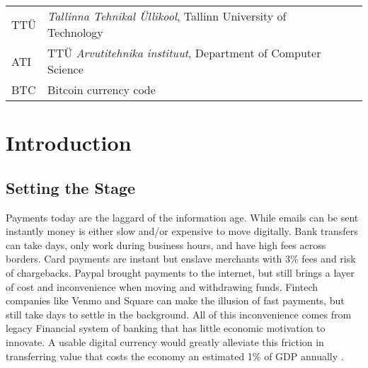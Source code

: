 \documentclass[12pt]{article} %
\begin{document}
\begin{tabular}{p{3 cm}ll} %
TTÜ & \textit{Tallinna Tehnikal Üllikool}, Tallinn University of Technology\\
ATI & TTÜ \textit{Arvutitehnika instituut}, Department of Computer Science\\
BTC & Bitcoin currency code
\end{tabular}


\pagebreak

\tableofcontents
\newpage

\listoffigures
\pagebreak

\listoftables
\pagebreak

\section{Introduction}
\label{Introduction\texttt{}}

\subsection{Setting the Stage}
Payments today are the laggard of the information age. While emails can be sent instantly money is either slow and/or expensive to move digitally. Bank transfers can take days, only work during business hours, and have high fees across borders. Card payments are instant but enslave merchants with 3\% fees and risk of chargebacks. Paypal brought payments to the internet, but still brings a layer of cost and inconvenience when moving and withdrawing funds. Fintech companies like Venmo and Square can make the illusion of fast payments, but still take days to settle in the background. All of this inconvenience comes from legacy Financial system of banking that has little economic motivation to innovate. A usable digital currency would greatly alleviate this friction in transferring value that costs the economy an estimated 1\% of GDP annually .
\end{document}
